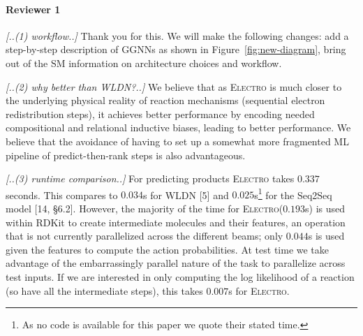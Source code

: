 \documentclass{article}
\newcommand{\ourModel}{\textsc{Electro}\xspace}
\begin{document}
\vspace{-5pt}
\paragraph{Reviewer 1}

\emph{[..(1) workflow..]}
Thank you for this. We will make the following changes: add a step-by-step description of GGNNs as shown in Figure~\ref{fig:new-diagram}, bring out of the SM information on architecture choices and workflow. 

\emph{[..(2) why better than WLDN?..]}
We believe that as \ourModel is much closer to the underlying physical reality of reaction mechanisms (sequential electron redistribution steps), it achieves better performance by encoding needed compositional and relational inductive biases, leading to better performance.
We believe that the avoidance of having to set up a somewhat more fragmented ML pipeline of predict-then-rank steps is also advantageous.  %


\emph{[..(3) runtime comparison..]}
For predicting products %
\ourModel takes $0.337$ seconds. This compares to $0.034$s for WLDN [5] and $0.025$s\footnote{As no code is available for this paper we quote their stated time.} for the Seq2Seq model [14, \S6.2]. 
 However, the majority of the time for \ourModel ($0.193$s) is used within RDKit to create intermediate molecules and their features, an operation that is not currently parallelized across the different beams; only $0.044$s is used given the features to compute the action probabilities.
  At test time we take advantage of the embarrassingly parallel nature of the task to parallelize across test inputs. 
   If we are interested in only computing the log likelihood of a reaction (so have all the intermediate steps), this takes $0.007$s for \ourModel. %
\end{document}
